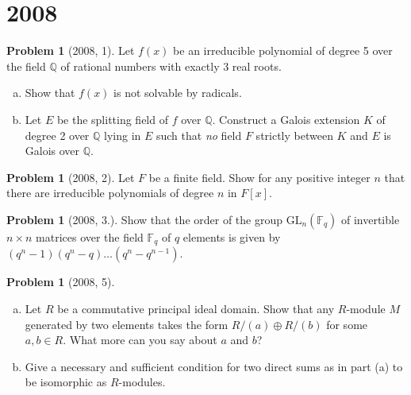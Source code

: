 \documentclass{article}
\newcommand{\<}{\langle} %
\renewcommand{\>}{\rangle} %
\theoremstyle{plain}
\theoremstyle{remark}
\theoremstyle{definition}
\newtheorem{examproblem}[equation]{Problem}
\begin{document}
\section{2008}
\begin{examproblem}[2008, 1]
	Let $f(x)$ be an irreducible polynomial of degree 5 over the field
	$\mathbb Q$ of rational numbers with exactly 3 real roots.
	\begin{enumerate}[(a)]
		\item Show that $f(x)$ is not solvable by radicals.
		\item Let $E$ be the splitting field of $f$ over $\mathbb Q$.
			Construct a Galois extension $K$ of degree 2 over
			$\mathbb Q$ lying in $E$ such that \textit{no} field $F$
			strictly between $K$ and $E$ is Galois over $\mathbb Q$.
	\end{enumerate}
\end{examproblem}

\begin{examproblem}[2008, 2]
	Let $F$ be a finite field. Show for any positive integer $n$ that
	there are irreducible polynomials of degree $n$ in $F[x]$.
\end{examproblem}

\begin{examproblem}[2008, 3.]
	Show that the order of the group $\text{GL}_n(\mathbb F_q)$ of invertible
	$n\times n$ matrices over the field $\mathbb F_q$ of $q$ elements is given by
	$(q^n-1)(q^n-q)\dots(q^n-q^{n-1})$.
\end{examproblem}

\begin{examproblem}[2008, 5]
	\begin{enumerate}[(a)]
		\item Let $R$ be a commutative principal ideal domain. Show that
			any $R$-module $M$ generated by two elements takes the form
			$R/(a)\oplus R/(b)$ for some $a,b\in R$. What more
			can you say about $a$ and $b$?
		\item Give a necessary and sufficient condition for two direct sums
			as in part (a) to be isomorphic as $R$-modules.
	\end{enumerate}
\end{examproblem}
\end{document}
